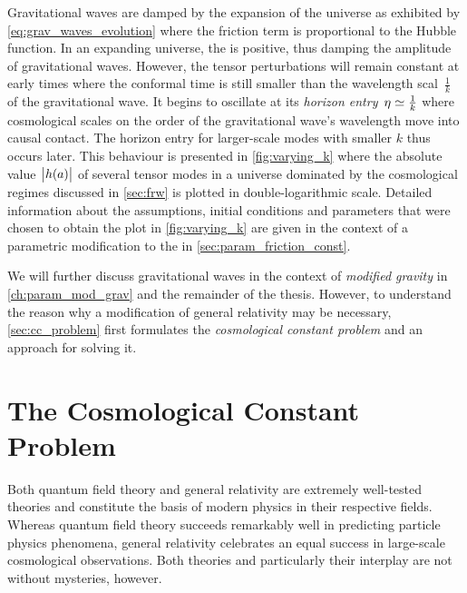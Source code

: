 \documentclass[12pt,parskip=half]{scrreprt}
\begin{document}
Gravitational waves are damped by the expansion of the universe as exhibited by \eqref{eq:grav_waves_evolution} where the friction term is proportional to the Hubble function. In an expanding universe, the  is positive, thus damping the amplitude of gravitational waves. However, the tensor perturbations will remain constant at early times where the conformal time is still smaller than the wavelength scal~\(\frac{1}{k}\) of the gravitational wave. It begins to oscillate at its \emph{horizon entry}~\(\eta \simeq \frac{1}{k}\) where cosmological scales on the order of the gravitational wave's wavelength move into causal contact. The horizon entry for larger-scale modes with smaller \(k\) thus occurs later. This behaviour is presented in \autoref{fig:varying_k} where the absolute value~\(\abs{h(a)}\) of several tensor modes in a universe dominated by the cosmological regimes discussed in \autoref{sec:frw} is plotted in double-logarithmic scale. Detailed information about the assumptions, initial conditions and parameters that were chosen to obtain the plot in \autoref{fig:varying_k} are given in the context of a parametric modification to the  in \autoref{sec:param_friction_const}.





We will further discuss gravitational waves in the context of \emph{modified gravity} in \autoref{ch:param_mod_grav} and the remainder of the thesis. However, to understand the reason why a modification of general relativity may be necessary, \autoref{sec:cc_problem} first formulates the \emph{cosmological constant problem} and an approach for solving it.

\section{The Cosmological Constant Problem}\label{sec:cc_problem}

Both quantum field theory and general relativity are extremely well-tested theories and constitute the basis of modern physics in their respective fields. Whereas quantum field theory succeeds remarkably well in predicting particle physics phenomena, general relativity celebrates an equal success in large-scale cosmological observations. Both theories and particularly their interplay are not without mysteries, however.
\end{document}
